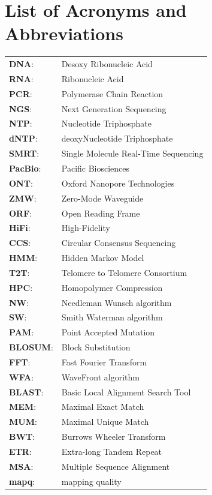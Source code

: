 \documentclass[
  11pt,
  twoside,
  BCOR=10mm,
  listof=totoc]{scrbook}
\begin{document}
\chapter{List of Acronyms and Abbreviations}
\begin{tabular}{ll}
\textbf{DNA}:& Desoxy Ribonucleic Acid \\
\textbf{RNA}:& Ribonucleic Acid \\
\textbf{PCR}:& Polymerase Chain Reaction \\
\textbf{NGS}:& Next Generation Sequencing \\
\textbf{NTP}:& Nucleotide Triphosphate \\
\textbf{dNTP}:& deoxyNucleotide Triphosphate \\
\textbf{SMRT}:& Single Molecule Real-Time Sequencing \\
\textbf{PacBio}:& Pacific Biosciences \\
\textbf{ONT}:& Oxford Nanopore Technologies \\
\textbf{ZMW}:& Zero-Mode Waveguide \\
\textbf{ORF}:& Open Reading Frame \\
\textbf{HiFi}:& High-Fidelity \\
\textbf{CCS}:& Circular Consensus Sequencing\\
\textbf{HMM}:& Hidden Markov Model\\
\textbf{T2T}:& Telomere to Telomere Consortium \\
\textbf{HPC}:& Homopolymer Compression\\
\textbf{NW}:& Needleman Wunsch algorithm \\
\textbf{SW}:& Smith Waterman algorithm \\
\textbf{PAM}:& Point Accepted Mutation \\
\textbf{BLOSUM}:& Block Substitution \\
\textbf{FFT}:& Fast Fourier Transform \\
\textbf{WFA}:& WaveFront algorithm \\
\textbf{BLAST}:& Basic Local Alignment Search Tool \\
\textbf{MEM}:& Maximal Exact Match \\
\textbf{MUM}:& Maximal Unique Match \\
\textbf{BWT}:& Burrows Wheeler Transform \\
\textbf{ETR}:& Extra-long Tandem Repeat \\
\textbf{MSA}:& Multiple Sequence Alignment \\
\textbf{mapq}:& mapping quality \\

\end{tabular}
\end{document}
